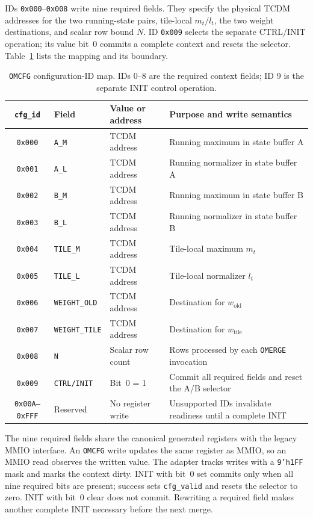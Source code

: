 \documentclass[journal]{IEEEtran}
\begin{document}
IDs \texttt{0x000}--\texttt{0x008} write nine required fields. They specify
the physical TCDM addresses for the two running-state pairs, tile-local
$m_t/l_t$, the two weight destinations, and scalar row bound $N$. ID
\texttt{0x009} selects the separate CTRL/INIT operation; its value bit~0
commits a complete context and resets the selector. Table~\ref{tab:omcfg_map}
lists the mapping and its boundary.

\begin{table}[t]
\centering
\caption{\texttt{OMCFG} configuration-ID map. IDs 0--8 are the required
context fields; ID 9 is the separate INIT control operation.}
\label{tab:omcfg_map}
\scriptsize
\setlength{\tabcolsep}{3pt}
\begin{tabular}{@{}c l p{6.3cm} p{7.0cm}@{}}
\toprule
\texttt{cfg\_id} & Field & Value or address & Purpose and write semantics \\
\midrule
\texttt{0x000} & \texttt{A\_M} & TCDM address & Running maximum in state buffer A \\
\texttt{0x001} & \texttt{A\_L} & TCDM address & Running normalizer in state buffer A \\
\texttt{0x002} & \texttt{B\_M} & TCDM address & Running maximum in state buffer B \\
\texttt{0x003} & \texttt{B\_L} & TCDM address & Running normalizer in state buffer B \\
\texttt{0x004} & \texttt{TILE\_M} & TCDM address & Tile-local maximum $m_t$ \\
\texttt{0x005} & \texttt{TILE\_L} & TCDM address & Tile-local normalizer $l_t$ \\
\texttt{0x006} & \texttt{WEIGHT\_OLD} & TCDM address & Destination for $w_{\mathrm{old}}$ \\
\texttt{0x007} & \texttt{WEIGHT\_TILE} & TCDM address & Destination for $w_{\mathrm{tile}}$ \\
\texttt{0x008} & \texttt{N} & Scalar row count & Rows processed by each \texttt{OMERGE} invocation \\
\texttt{0x009} & \texttt{CTRL/INIT} & Bit~0 = 1 & Commit all required fields and reset the A/B selector \\
\texttt{0x00A--0xFFF} & Reserved & No register write & Unsupported IDs invalidate readiness until a complete INIT \\
\bottomrule
\end{tabular}
\end{table}

The nine required fields share the canonical generated registers with the
legacy MMIO interface. An \texttt{OMCFG} write updates the same register as
MMIO, so an MMIO read observes the written value. The adapter tracks writes
with a \texttt{9'h1FF} mask and marks the context dirty. INIT with bit~0 set
commits only when all nine required bits are present; success sets
\texttt{cfg\_valid} and resets the selector to zero. INIT with bit~0 clear
does not commit. Rewriting a required field makes another complete INIT
necessary before the next merge.
\end{document}
